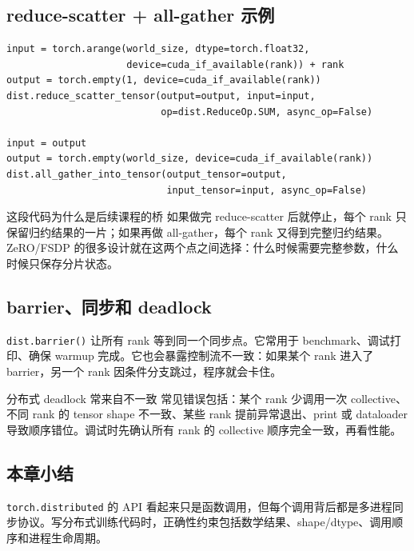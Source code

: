 \documentclass[a4paper]{article}
\newcommand{\code}[1]{\texttt{#1}}
\begin{document}
\subsection{reduce-scatter + all-gather 示例}

\begin{lstlisting}[caption={reduce-scatter 后接 all-gather 复原 all-reduce 语义}]
input = torch.arange(world_size, dtype=torch.float32,
                     device=cuda_if_available(rank)) + rank
output = torch.empty(1, device=cuda_if_available(rank))
dist.reduce_scatter_tensor(output=output, input=input,
                           op=dist.ReduceOp.SUM, async_op=False)

input = output
output = torch.empty(world_size, device=cuda_if_available(rank))
dist.all_gather_into_tensor(output_tensor=output,
                            input_tensor=input, async_op=False)
\end{lstlisting}

\begin{importantbox}{这段代码为什么是后续课程的桥}
如果做完 reduce-scatter 后就停止，每个 rank 只保留归约结果的一片；如果再做 all-gather，每个 rank 又得到完整归约结果。ZeRO/FSDP 的很多设计就在这两个点之间选择：什么时候需要完整参数，什么时候只保存分片状态。
\end{importantbox}

\subsection{barrier、同步和 deadlock}

\code{dist.barrier()} 让所有 rank 等到同一个同步点。它常用于 benchmark、调试打印、确保 warmup 完成。它也会暴露控制流不一致：如果某个 rank 进入了 barrier，另一个 rank 因条件分支跳过，程序就会卡住。

\begin{warningbox}{分布式 deadlock 常来自不一致}
常见错误包括：某个 rank 少调用一次 collective、不同 rank 的 tensor shape 不一致、某些 rank 提前异常退出、print 或 dataloader 导致顺序错位。调试时先确认所有 rank 的 collective 顺序完全一致，再看性能。
\end{warningbox}

\subsection{本章小结}

\code{torch.distributed} 的 API 看起来只是函数调用，但每个调用背后都是多进程同步协议。写分布式训练代码时，正确性约束包括数学结果、shape/dtype、调用顺序和进程生命周期。
\end{document}
